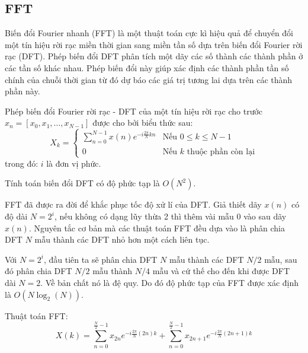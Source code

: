 \documentclass[conference]{IEEEtran}
\begin{document}
\subsection{FFT}
Biến đổi Fourier nhanh (FFT) là một thuật toán cực kì hiệu quả để chuyển đổi một tín hiệu rời rạc miền thời gian sang miền tần số dựa trên biến đổi Fourier rời rạc (DFT). Phép biến đổi DFT phân tích một dãy các số thành các thành phần ở các tần số khác nhau. Phép biến đổi này giúp xác định các thành phần tần số chính của chuỗi thời gian từ đó dự báo các giá trị tương lai dựa trên các thành phần này.

Phép biến đổi Fourier rời rạc - DFT của một tín hiệu rời rạc cho trước \( x_n = [x_0, x_1, \ldots, x_{N-1}] \) được cho bởi biểu thức sau:
\[
X_k = 
\begin{cases} 
\sum_{n=0}^{N-1} x(n) e^{-i \frac{2\pi}{N} kn} & \text{Nếu } 0 \leq k \leq N-1 \\ 
0 & \text{Nếu } k \text{ thuộc phần còn lại} 
\end{cases}
\]
trong đó: \(i\) là đơn vị phức. 

Tính toán biến đổi DFT có độ phức tạp là \(O(N^2)\).

FFT đã được ra đời để khắc phục tốc độ xử lí của DFT. Giả thiết dãy \(x(n)\) có độ dài \(N = 2^i\), nếu không có dạng lũy thừa 2 thì thêm vài mẫu 0 vào sau dãy \(x(n)\). Nguyên tắc cơ bản mà các thuật toán FFT đều dựa vào là phân chia DFT \(N\) mẫu thành các DFT nhỏ hơn một cách liên tục. 

Với \(N = 2^i\), đầu tiên ta sẽ phân chia DFT \(N\) mẫu thành các DFT \(N/2\) mẫu, sau đó phân chia DFT \(N/2\) mẫu thành \(N/4\) mẫu và cứ thế cho đến khi được DFT dài \(N = 2\). Về bản chất nó là đệ quy. Do đó độ phức tạp của FFT được xác định là \(O(N \log_2 (N))\).

Thuật toán FFT:
\[
X(k) = \sum_{n=0}^{\frac{N}{2}-1} x_{2n} e^{-i \frac{2\pi}{N} (2n) k} + \sum_{n=0}^{\frac{N}{2}-1} x_{2n+1} e^{-i \frac{2\pi}{N} (2n+1) k}
\]
\end{document}
